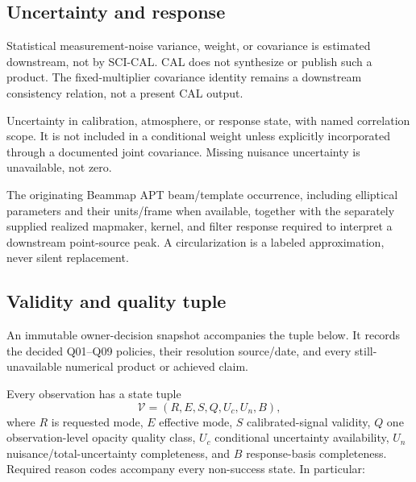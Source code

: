 \subsection{Uncertainty and response}

 Statistical measurement-noise
variance, weight, or covariance is estimated downstream, not by SCI-CAL. CAL
does not synthesize or publish such a product. The fixed-multiplier covariance
identity remains a downstream consistency relation, not a present CAL output.

 Uncertainty in calibration, atmosphere, or
response state, with named correlation scope. It is not included in a
conditional weight unless explicitly incorporated through a documented joint
covariance. Missing nuisance uncertainty is unavailable, not zero.

 The originating Beammap APT beam/template occurrence,
including elliptical parameters and their units/frame when available,
together with the separately supplied realized mapmaker, kernel, and filter
response required to interpret a downstream point-source peak. A
circularization is a labeled approximation, never silent replacement.

\subsection{Validity and quality tuple}

An immutable owner-decision snapshot accompanies the tuple below. It records
the decided Q01--Q09 policies, their resolution source/date, and every
still-unavailable numerical product or achieved claim.

Every observation has a state tuple
\begin{equation}
 \mathcal V=(R,E,S,Q,U_c,U_n,B),
 \label{eq:validity-tuple}
\end{equation}
where $R$ is requested mode, $E$ effective mode, $S$ calibrated-signal
validity, $Q$ one observation-level opacity quality class, $U_c$ conditional
uncertainty availability, $U_n$ nuisance/total-uncertainty completeness, and
$B$ response-basis completeness. Required reason codes accompany every
non-success state. In particular:

